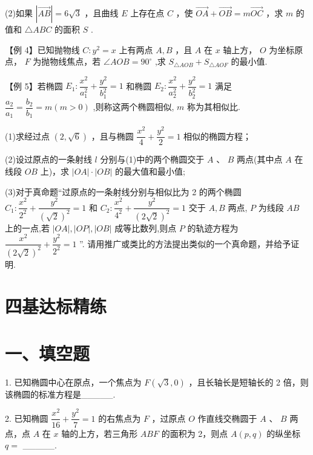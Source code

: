 (2)如果 $\left| \overrightarrow{AB}\right|  = 6\sqrt{3}$ ，且曲线 $E$ 上存在点 $C$ ，使 $\overrightarrow{OA} + \overrightarrow{OB} = m\overrightarrow{OC}$ ，求 $m$ 的值和 $\bigtriangleup  {ABC}$ 的面积 $S$ .

【例 4】已知抛物线 $C : {y}^{2} = x$ 上有两点 $A,B$ ，且 $A$ 在 $x$ 轴上方， $O$ 为坐标原点， $F$ 为抛物线焦点，若 $\angle {AOB} = {90}^{ \circ  }$ ,求 ${S}_{\bigtriangleup {AOB}} + {S}_{\bigtriangleup {AOF}}$ 的最小值.

【例 5】若椭圆 ${E}_{1} : \dfrac{{x}^{2}}{{a}_{1}^{2}} + \dfrac{{y}^{2}}{{b}_{1}^{2}} = 1$ 和椭圆 ${E}_{2} : \dfrac{{x}^{2}}{{a}_{2}^{2}} + \dfrac{{y}^{2}}{{b}_{2}^{2}} = 1$ 满足 $\dfrac{{a}_{2}}{{a}_{1}} = \dfrac{{b}_{2}}{{b}_{1}} = m\left( {m > 0}\right)$ ,则称这两个椭圆相似, $m$ 称为其相似比.

(1)求经过点 $\left( {2,\sqrt{6}}\right)$ ，且与椭圆 $\dfrac{{x}^{2}}{4} + \dfrac{{y}^{2}}{2} = 1$ 相似的椭圆方程；

(2)设过原点的一条射线 $l$ 分别与(1)中的两个椭圆交于 $A$ 、 $B$ 两点(其中点 $A$ 在线段 ${OB}$ 上)，求 $\left| {OA}\right|  \cdot  \left| {OB}\right|$ 的最大值和最小值;

(3)对于真命题“过原点的一条射线分别与相似比为 2 的两个椭圆 ${C}_{1} : \dfrac{{x}^{2}}{{2}^{2}} + \dfrac{{y}^{2}}{{\left( \sqrt{2}\right) }^{2}} = 1$ 和 ${C}_{2} : \dfrac{{x}^{2}}{{4}^{2}} +  \dfrac{{y}^{2}}{{\left( 2\sqrt{2}\right) }^{2}} = 1$ 交于 $A,B$ 两点, $P$ 为线段 ${AB}$ 上的一点,若 $\left| {OA}\right| ,\left| {OP}\right| ,\left| {OB}\right|$ 成等比数列,则点 $P$ 的轨迹方程为 $\dfrac{{x}^{2}}{{\left( 2\sqrt{2}\right) }^{2}} + \dfrac{{y}^{2}}{{2}^{2}} = 1$ ”. 请用推广或类比的方法提出类似的一个真命题，并给予证明.

\section*{四基达标精练}

\section*{一、填空题}

1. 已知椭圆中心在原点，一个焦点为 $F\left( {\sqrt{3},0}\right)$ ，且长轴长是短轴长的 2 倍，则该椭圆的标准方程是\_\_\_\_\_.

2. 已知椭圆 $\dfrac{{x}^{2}}{16} + \dfrac{{y}^{2}}{7} = 1$ 的右焦点为 $F$ ，过原点 $O$ 作直线交椭圆于 $A$ 、 $B$ 两点，点 $A$ 在 $x$ 轴的上方，若三角形 ${ABF}$ 的面积为 2，则点 $A\left( {p,q}\right)$ 的纵坐标 $q =$ \_\_\_\_\_.

